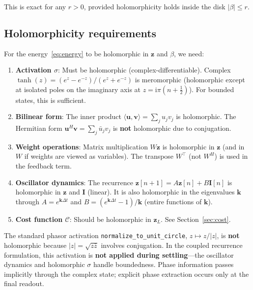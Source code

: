 \documentclass[11pt]{article}
\newcommand{\im}{\mathrm{i}}
\newcommand{\dt}{\Delta t}
\theoremstyle{definition}
\begin{document}
This is exact for any $r>0$, provided holomorphicity holds inside the
disk $|\beta|\le r$.

\subsection{Holomorphicity requirements}\label{sec:holo-req}

For the energy~\eqref{eq:energy} to be holomorphic in $\bm{z}$ and
$\beta$, we need:

\begin{enumerate}
\item \textbf{Activation $\sigma$}: Must be holomorphic (complex-differentiable).
  Complex $\tanh(z) = (e^z-e^{-z})/(e^z+e^{-z})$ is meromorphic
  (holomorphic except at isolated poles on the imaginary axis at
  $z=\im\pi(n+\tfrac{1}{2})$).  For bounded states, this is sufficient.

\item \textbf{Bilinear form}: The inner product
  $\langle\bm{u},\bm{v}\rangle=\sum_j u_j v_j$ is holomorphic.
  The Hermitian form $\bm{u}^H\bm{v}=\sum_j\bar{u}_j v_j$ is
  \textbf{not} holomorphic due to conjugation.

\item \textbf{Weight operations}: Matrix multiplication
  $W\bm{z}$ is holomorphic in $\bm{z}$ (and in $W$ if weights are
  viewed as variables).  The transpose $W^{\!\top}$ (not $W^H$) is
  used in the feedback term.

\item \textbf{Oscillator dynamics}: The recurrence
  $\bm{z}[n+1]=A\bm{z}[n]+B\bm{I}[n]$ is holomorphic in
  $\bm{z}$ and $\bm{I}$ (linear).  It is also holomorphic in the
  eigenvalues $\bm{k}$ through $A=e^{\bm{k}\dt}$ and
  $B=(e^{\bm{k}\dt}-1)/\bm{k}$ (entire functions of $\bm{k}$).

\item \textbf{Cost function $\mathcal{C}$}: Should be holomorphic
  in $\bm{z}_L$.  See Section~\ref{sec:cost}.
\end{enumerate}

The standard phasor activation \texttt{normalize\_to\_unit\_circle},
$z\mapsto z/|z|$, is \textbf{not} holomorphic because
$|z|=\sqrt{z\bar{z}}$ involves conjugation.  In the coupled
recurrence formulation, this activation is \textbf{not applied during
settling}---the oscillator dynamics and holomorphic $\sigma$ handle
boundedness.  Phase information passes implicitly through the complex
state; explicit phase extraction occurs only at the final readout.
\end{document}
